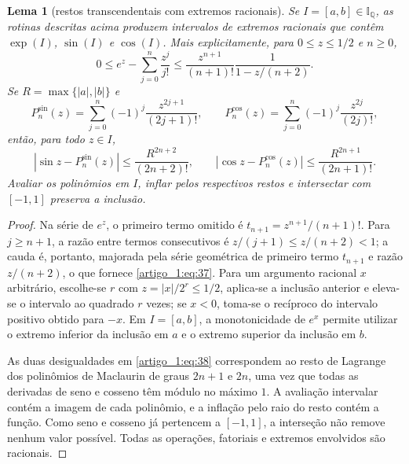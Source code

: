 \documentclass[12pt,a4paper]{article}
\theoremstyle{preciso}
\newtheorem{lema}[teorema]{Lema}
\theoremstyle{definition}
\newcommand{\Q}{\mathbb Q}
\newcommand{\eqn}[2]{\begin{equation}\label{eq:#1}#2\end{equation}}
\theoremstyle{preciso}
\theoremstyle{preciso}
\theoremstyle{preciso}
\theoremstyle{preciso}
\theoremstyle{definition}
\theoremstyle{preciso}
\theoremstyle{definition}
\theoremstyle{preciso}
\theoremstyle{preciso}
\theoremstyle{definition}
\begin{document}
\begin{lema}[restos transcendentais com extremos racionais]\label{map:artigo_1:6.1}
Se $I=[a,b]\in\mathbb I_{\Q}$, as rotinas descritas acima produzem intervalos de extremos racionais que contêm $\exp(I)$, $\sin(I)$ e $\cos(I)$. Mais explicitamente, para $0\le z\le1/2$ e $n\ge0$,
\eqn{37}{0\le e^z-\sum_{j=0}^n\frac{z^j}{j!}
\le\frac{z^{n+1}}{(n+1)!}\frac1{1-z/(n+2)}.}
Se $R=\max\{|a|,|b|\}$ e
\[
P_n^{\sin}(z)=\sum_{j=0}^n(-1)^j\frac{z^{2j+1}}{(2j+1)!},\qquad
P_n^{\cos}(z)=\sum_{j=0}^n(-1)^j\frac{z^{2j}}{(2j)!},
\]
então, para todo $z\in I$,
\eqn{38}{|\sin z-P_n^{\sin}(z)|\le\frac{R^{2n+2}}{(2n+2)!},\qquad
|\cos z-P_n^{\cos}(z)|\le\frac{R^{2n+1}}{(2n+1)!}.}
Avaliar os polinômios em $I$, inflar pelos respectivos restos e intersectar com $[-1,1]$ preserva a inclusão.
\end{lema}
\begin{proof}
Na série de $e^z$, o primeiro termo omitido é $t_{n+1}=z^{n+1}/(n+1)!$. Para $j\ge n+1$, a razão entre termos consecutivos é $z/(j+1)\le z/(n+2)<1$; a cauda é, portanto, majorada pela série geométrica de primeiro termo $t_{n+1}$ e razão $z/(n+2)$, o que fornece \eqref{artigo_1:eq:37}. Para um argumento racional $x$ arbitrário, escolhe-se $r$ com $z=|x|/2^r\le1/2$, aplica-se a inclusão anterior e eleva-se o intervalo ao quadrado $r$ vezes; se $x<0$, toma-se o recíproco do intervalo positivo obtido para $-x$. Em $I=[a,b]$, a monotonicidade de $e^x$ permite utilizar o extremo inferior da inclusão em $a$ e o extremo superior da inclusão em $b$.

As duas desigualdades em \eqref{artigo_1:eq:38} correspondem ao resto de Lagrange dos polinômios de Maclaurin de graus $2n+1$ e $2n$, uma vez que todas as derivadas de seno e cosseno têm módulo no máximo $1$. A avaliação intervalar contém a imagem de cada polinômio, e a inflação pelo raio do resto contém a função. Como seno e cosseno já pertencem a $[-1,1]$, a interseção não remove nenhum valor possível. Todas as operações, fatoriais e extremos envolvidos são racionais.
\end{proof}
\end{document}
